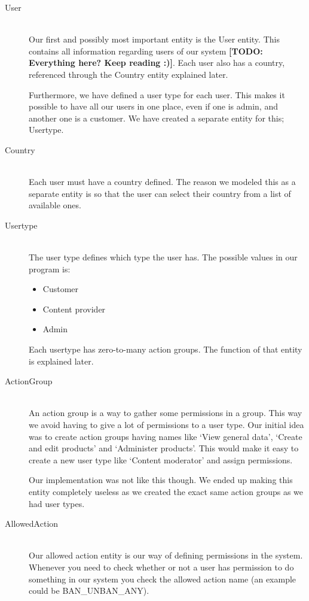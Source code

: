 \begin{description}
\item[User] \hfill \\
Our first and possibly most important entity is the User entity. This contains all information regarding users of our system \textbf{[TODO: Everything here? Keep reading :)]}. Each user also has a country, referenced through the Country entity explained later.

Furthermore, we have defined a user type for each user. This makes it possible to have all our users in one place, even if one is admin, and another one is a customer. We have created a separate entity for this; Usertype.

\item[Country] \hfill \\
Each user must have a country defined. The reason we modeled this as a separate entity is so that the user can select their country from a list of available ones.

\item[Usertype] \hfill \\
The user type defines which type the user has. The possible values in our program is:
\begin{itemize}
	\item Customer
	\item Content provider
	\item Admin
\end{itemize}

Each usertype has zero-to-many action groups. The function of that entity is explained later.

\item[ActionGroup] \hfill \\
An action group is a way to gather some permissions in a group. This way we avoid having to give a lot of permissions to a user type. Our initial idea was to create action groups having names like `View general data', `Create and edit products' and `Administer products'. This would make it easy to create a new user type like `Content moderator' and assign permissions.

Our implementation was not like this though. We ended up making this entity completely useless as we created the exact same action groups as we had user types.

\item[AllowedAction] \hfill \\
Our allowed action entity is our way of defining permissions in the system. Whenever you need to check whether or not a user has permission to do something in our system you check the allowed action name (an example could be BAN\_UNBAN\_ANY).


\end{description}
